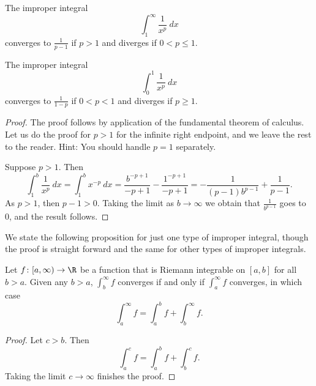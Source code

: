 \documentclass[12pt]{book}
\begin{document}
\begin{prop}
\label{impropriemann:ptest}
The improper integral
\begin{equation*}
\int_1^\infty \frac{1}{x^p} ~dx
\end{equation*}
converges to $\frac{1}{p-1}$ if $p > 1$ and diverges if $0 < p \leq 1$.

The improper integral
\begin{equation*}
\int_0^1 \frac{1}{x^p} ~dx
\end{equation*}
converges to $\frac{1}{1-p}$ if $0 < p < 1$ and diverges if $p \geq 1$.
\end{prop}

\begin{proof}
The proof follows by application of the fundamental theorem of calculus.
Let us do the proof for $p > 1$ for the infinite right endpoint, and
we leave the rest to the reader.
Hint: You should handle $p=1$
separately.

Suppose $p > 1$.
Then
\begin{equation*}
\int_1^b \frac{1}{x^p} ~dx
=
\int_1^b x^{-p} ~dx
=
\frac{b^{-p+1}}{-p+1}
-
\frac{1^{-p+1}}{-p+1}
=
-
\frac{1}{(p-1)b^{p-1}}
+
\frac{1}{p-1} .
\end{equation*}
As $p > 1$, then $p-1 > 0$.
Taking the limit as $b \to \infty$
we obtain that $\frac{1}{b^{p-1}}$ goes to 0, and the result follows.
\end{proof}

We state the following proposition for just one type
of improper integral, though the proof is straight
forward and the same for other types of improper integrals.

\begin{prop} \label{impropriemann:tail}
Let $f \colon [a,\infty) \to \R$ be a function
that is Riemann integrable on $[a,b]$ for all $b > a$.
Given any $b > a$,
$\int_b^\infty f$ converges if and only if $\int_a^\infty f$
converges, in which case
\begin{equation*}
\int_a^\infty f
=
\int_a^b f +
\int_b^\infty f .
\end{equation*}
\end{prop}

\begin{proof}
Let $c > b$.
Then
\begin{equation*}
\int_a^c f
=
\int_a^b f +
\int_b^c f .
\end{equation*}
Taking the limit $c \to \infty$ finishes the proof.
\end{proof}
\end{document}
